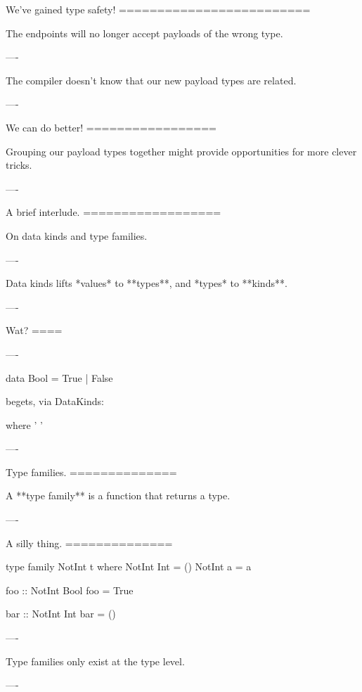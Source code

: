 We've gained type safety!
=========================

The endpoints will no longer accept payloads of the wrong type.

----

The compiler doesn't know that our new payload types are related.

----

We can do better!
=================

Grouping our payload types together might provide opportunities for more clever tricks.

----

A brief interlude.
==================

On data kinds and type families.

----

Data kinds lifts *values* to **types**, and *types* to **kinds**.

----

Wat?
====

----

\begin{hs}
  data Bool = True
            | False
\end{hs}

\begin{raw}
\end{raw}


begets, via DataKinds:

\begin{custom}

    where
     '
     '
\end{custom}

----

Type families.
==============

A **type family** is a function that returns a type.

----

A silly thing.
==============

\begin{hs}
  type family NotInt t where
    NotInt Int = ()
    NotInt a   = a

  foo :: NotInt Bool
  foo = True

  bar :: NotInt Int
  bar = ()
\end{hs}

----

Type families only exist at the type level.

----

